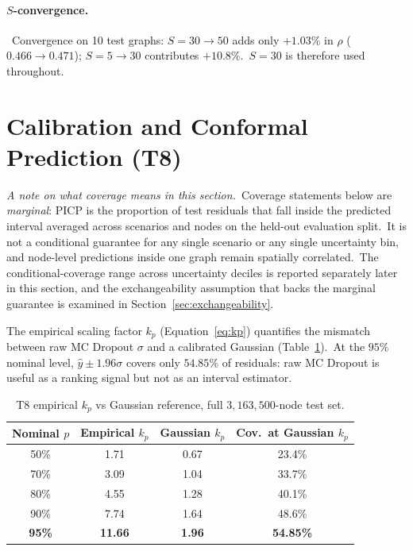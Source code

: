 \paragraph{$S$-convergence.}\label{sec:s_conv_results}\ Convergence on 10 test graphs: $S = 30 \to 50$ adds only $+1.03\%$ in $\rho$ ($0.466 \to 0.471$); $S = 5 \to 30$ contributes $+10.8\%$.\ $S = 30$ is therefore used throughout.

\section{Calibration and Conformal Prediction (T8)}\label{sec:calibration_results}

\noindent\emph{A note on what coverage means in this section.}\ Coverage statements below are \emph{marginal}: PICP is the proportion of test residuals that fall inside the predicted interval averaged across scenarios and nodes on the held-out evaluation split.\ It is not a conditional guarantee for any single scenario or any single uncertainty bin, and node-level predictions inside one graph remain spatially correlated.\ The conditional-coverage range across uncertainty deciles is reported separately later in this section, and the exchangeability assumption that backs the marginal guarantee is examined in Section~\ref{sec:exchangeability}.

The empirical scaling factor $k_p$ (Equation~\eqref{eq:kp}) quantifies the mismatch between raw MC Dropout $\sigma$ and a calibrated Gaussian (Table~\ref{tab:calibration_audit}).\ At the $95\%$ nominal level, $\hat y \pm 1.96\sigma$ covers only $54.85\%$ of residuals: raw MC Dropout is useful as a ranking signal but not as an interval estimator.

\begin{table}[htbp]
\centering
\caption[T8 MC Dropout calibration audit]{T8 empirical $k_p$ vs Gaussian reference, full $3{,}163{,}500$-node test set.}
\label{tab:calibration_audit}
\begin{tabular}{cccc}
\toprule
Nominal $p$ & Empirical $k_p$ & Gaussian $k_p$ & Cov.\ at Gaussian $k_p$ \\
\midrule
50\% & 1.71 & 0.67 & 23.4\% \\
70\% & 3.09 & 1.04 & 33.7\% \\
80\% & 4.55 & 1.28 & 40.1\% \\
90\% & 7.74 & 1.64 & 48.6\% \\
\textbf{95\%} & \textbf{11.66} & \textbf{1.96} & \textbf{54.85\%} \\
\bottomrule
\end{tabular}
\end{table}


